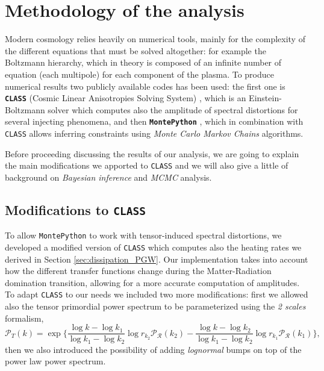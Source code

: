 \section{Methodology of the analysis}
Modern cosmology relies heavily on numerical tools, mainly for the complexity of the different equations that must be solved altogether: for example the Boltzmann hierarchy, which in theory is composed of an infinite number of equation (each multipole) for each component of the plasma.
To produce numerical results two publicly available codes has been used: the first one is \textbf{\texttt{CLASS}} (Cosmic Linear Anisotropies Solving System) \cite{CLASS}, which is an Einstein-Boltzmann solver which computes also the amplitude of spectral distortions for several injecting phenomena, and then \textbf{\texttt{MontePython}} \cite{Brinckmann:2018cvx,Audren:2012wb}, which in combination with \texttt{CLASS} allows inferring constraints using \emph{Monte Carlo Markov Chains} algorithms.

Before proceeding discussing the results of our analysis, we are going to explain the main modifications we apported to \texttt{CLASS} and we will also give a little of background on \textit{Bayesian inference} and \textit{MCMC} analysis.
\subsection{Modifications to \texttt{CLASS}}
To allow \texttt{MontePython} to work with tensor-induced spectral distortions, we developed a modified version of \texttt{CLASS} which computes also the heating rates we derived in Section \ref{sec:dissipation_PGW}. Our implementation takes into account how the different transfer functions change during the Matter-Radiation domination transition, allowing for a more accurate computation of amplitudes.\\
To adapt \texttt{CLASS} to our needs we included two more modifications: first we allowed also the tensor primordial power spectrum to be parameterized using the \emph{2 scales} formalism, 
$$\mathcal P_T(k)=\exp\bigg\{\frac{\log k-\log k_1}{\log k_1 -\log k_2}\log r_{k_2}\mathcal{P_R}(k_2)-\frac{\log k-\log k_2}{\log k_1 -\log k_2}\log r_{k_1}\mathcal{ P_{R}}(k_1)\bigg\},$$
 then we also introduced the possibility of adding \emph{lognormal} bumps on top of the power law power spectrum.
